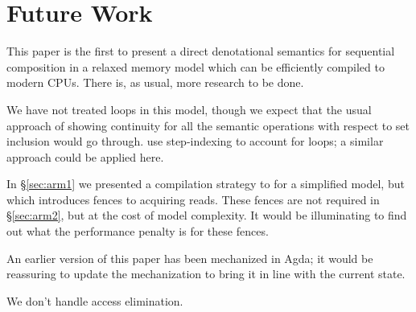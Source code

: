 \section{Future Work}

This paper is the first to present a direct denotational semantics for
sequential composition in a relaxed memory model which can be
efficiently compiled to modern CPUs. There is, as usual, more research
to be done.

We have not treated loops in this model, though we expect that the usual
approach of showing continuity for all the semantic operations with respect to set inclusion
would go through. \citet{DBLP:conf/esop/PaviottiCPWOB20} use step-indexing to account for
loops; a similar approach could be applied here.

In \S\ref{sec:arm1} we presented a compilation strategy to \armeight{}
for a simplified model, but which introduces fences to acquiring
reads. These fences are not required in \S\ref{sec:arm2}, but at the
cost of model complexity. It would be illuminating to find out what
the performance penalty is for these fences.

An earlier version of this paper has been mechanized in Agda; it would be
reassuring to update the mechanization to bring it in line with the current state.

We don't handle access elimination.




